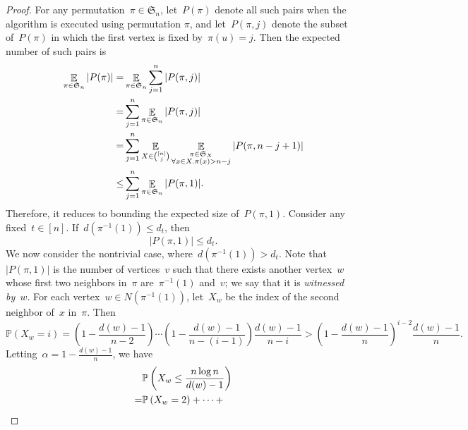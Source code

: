 \documentclass[10pt,a4paper]{amsart}
\begin{document}
\begin{proof}
  For any permutation~$\pi \in {\mathfrak {S}}_{n}$,
  let~$P(\pi)$ denote all such pairs when the algorithm is executed using permutation $\pi$, and let~$P(\pi, j)$ denote the subset of~$P(\pi)$ in which the first vertex is fixed by~$\pi(u) = j$.
  Then the expected number of such pairs is
  \begin{align}
    \notag
    \mathop{\mathbb{E}}_{\pi \in {\mathfrak {S}}_{n}} |P(\pi)| = & \mathop{\mathbb{E}}_{\pi \in {\mathfrak {S}}_{n}} \sum_{j = 1}^{n} |P(\pi, j)|
    \\      \notag
    =                                                            & \sum_{j = 1}^{n} \mathop{\mathbb{E}}_{\pi \in {\mathfrak {S}}_{n}}  |P(\pi, j)|
    \\      \notag
    =                                                            & \sum_{j=1}^n
    \mathop{\mathbb{E}}_{X\in {[n]\choose j}}
    \mathop{\mathbb{E}}_{\substack{{\pi \in {\mathfrak {S}}_{X}}                                                                                           \\  \forall x\in X. \pi(x) > n - j}}
    |P(\pi, n - j + 1)|
    \\
    \le                                                          & \sum_{j=1}^n \mathop{\mathbb{E}}_{\pi \in {\mathfrak {S}}_{n}} |P(\pi, 1)|.\label{eq:4}
  \end{align}
  Therefore, it reduces to bounding the expected size of~$P(\pi, 1)$.
  Consider any fixed~$t\in [n]$.
  If~$d(\pi^{-1}(1)) \le d_{t}$, then
  \begin{equation}
    \label{eq:5}
    |P(\pi, 1)| \le d_{t}.
  \end{equation}
  We now consider the nontrivial case, where~$d(\pi^{-1}(1)) > d_{t}$.
  Note that~$|P(\pi, 1)|$ is the number of vertices~$v$ such that there exists another vertex~$w$ whose first two neighbors in~$\pi$ are~$\pi^{-1}(1)$ and~$v$; we say that it is \emph{witnessed by~$w$}.
  For each vertex~$w\in N(\pi^{-1}(1))$, let~$X_{w}$ be the index of the second neighbor of~$x$ in~$\pi$.  Then
  \[
    \mathbb{P}\left( X_{w}=i\right) = \left(1-\frac {d(w)-1}{n-2}\right)\cdots \left(1-\frac {d(w)-1}{n-(i-1)}\right) \frac{d(w)-1}{n-i} >                                                   \left(1- \frac {d(w)-1}{n} \right)^{i - 2} \frac{d(w)-1}{n}.
  \]
  Letting~$\alpha = 1-\frac {d(w)-1}{n}$, we have
  \begin{align}
    \notag
      & \mathbb{P}\left(X_{w}\le {\frac {n \log n}{d(w)-1}} \right)
    \\
    \notag
    = & \mathbb{P}\left(X_{w}=2  \right) + \cdots +

\end{align}
\end{proof}
\end{document}
